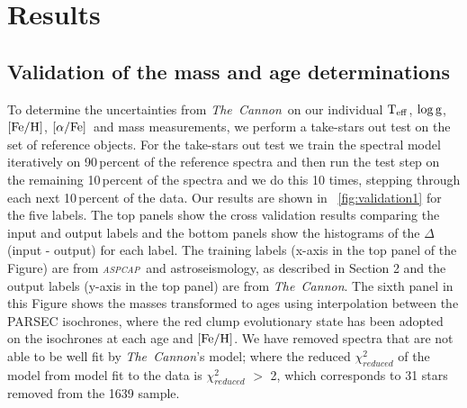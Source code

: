 \documentclass[12pt, preprint]{aastex}
\newcommand{\project}[1]{\textsl{#1}}
\newcommand{\tc}{\project{The~Cannon}}
\newcommand{\aspcap}{\project{\textsc{aspcap}}}
\newcommand{\teff}{\mbox{$\rm T_{eff}$}}
\newcommand{\feh}{\mbox{$\rm [Fe/H]$}}
\newcommand{\alphafe}{\mbox{$\rm [\alpha/Fe]$}}
\newcommand{\logg}{\mbox{$\rm \log g$}}
\begin{document}
\section{Results}

\subsection{Validation of the mass and age determinations}

To determine the uncertainties from \tc\ on our individual \teff, \logg, \feh, \alphafe\ and mass measurements, we perform a take-stars out test on the set of reference objects.
For the take-stars out test we train the spectral model iteratively on 90\,percent of the reference spectra and then run the test step on the remaining 10\,percent of the spectra and we do this 10 times, stepping through each next 10\,percent of the data. Our results are shown in \figurename~\ref{fig:validation1} for the five labels. The top panels show the cross validation results comparing the input and output labels and the bottom panels show the histograms of the $\Delta$(input - output) for each label. The training labels (x-axis in the top panel of the Figure) are from \aspcap\ and astroseismology, as described in Section 2 and the output labels (y-axis in the top panel) are from \tc.  The sixth panel in this Figure shows the masses transformed to ages using interpolation between the PARSEC isochrones, where the red clump evolutionary state has been adopted on the isochrones at each age and \feh. We have removed spectra that are not able to be well fit by \tc's model; where the reduced $\chi_{reduced}^2$ of the model from model fit to the data is $\chi_{reduced}^2$ $>$ 2, which corresponds to 31 stars removed from the 1639 sample.
\end{document}
